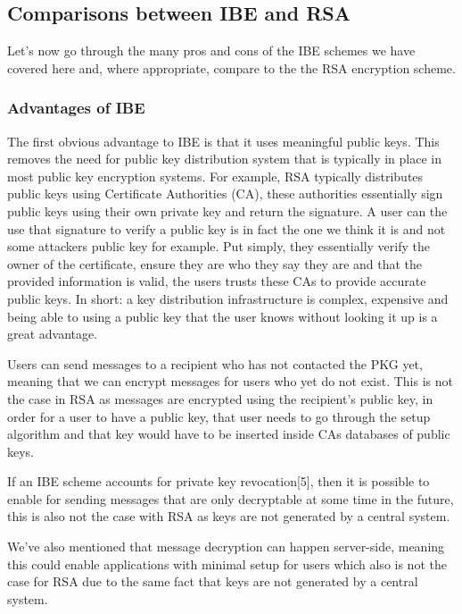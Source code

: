 \documentclass[conference]{IEEEtran}
\begin{document}
\subsection{Comparisons between IBE and RSA}
Let's now go through the many pros and cons of the IBE schemes we 
have covered here and, where appropriate, compare to the the 
RSA encryption scheme.


\subsubsection{Advantages of IBE}
The first obvious advantage to IBE is that it uses 
meaningful public keys. This removes the need for public key distribution system
that is typically in place in most public key encryption systems. For example,
RSA typically distributes public keys using Certificate Authorities (CA), these authorities
essentially sign public keys using their own private key and return the signature. A user
can the use that signature to verify a public key is in fact the one we think it is 
and not some attackers public key for example. Put simply, 
they essentially verify the owner of the certificate, 
ensure they are who they say they are and that the provided information is valid,
the users trusts these CAs to provide accurate public keys.
In short: a key distribution infrastructure is complex, expensive and being able to 
using a public key that the user knows without looking it up is a great advantage.


Users can send messages to a recipient who has not contacted the PKG yet, meaning that 
we can encrypt messages for users who yet do not exist. This is not the case in RSA
as messages are encrypted using the recipient's public key, in order for a user to have a 
public key, that user needs to go through the setup algorithm and 
that key would have to be inserted inside CAs databases of public keys.

If an IBE scheme accounts for private key revocation[5], then it is possible to enable for 
sending messages that are only decryptable at some time in the future, this is also not the 
case with RSA as keys are not generated by a central system.


We've also mentioned that message decryption can happen server-side, meaning 
this could enable applications with minimal setup for users which also is not the case for 
RSA due to the same fact that keys are not generated by a central system.
 
\end{document}
